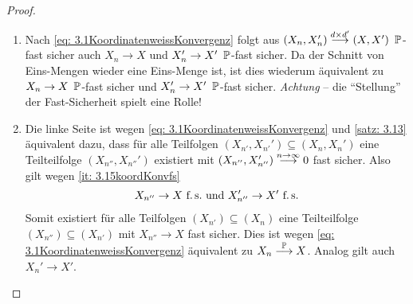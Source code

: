 \begin{proof}
	\begin{enumerate}[label=(zu \arabic*), leftmargin=*]
		\item Nach \cref{eq: 3.1KoordinatenweissKonvergenz} folgt aus $(X_n,X_n') \overset{d \times d'}{\longrightarrow} (X,X') \enskip \P$-fast sicher auch $X_n \to X$ und $X_n' \to X' \enskip \P$-fast sicher. Da der Schnitt von Eins-Mengen wieder eine Eins-Menge ist, ist dies wiederum äquivalent zu $X_n \to X \enskip \P$-fast sicher und $X_n' \to X' \enskip \P$-fast sicher. \textit{Achtung} -- die \enquote{Stellung} der Fast-Sicherheit spielt eine Rolle!
		\item Die linke Seite ist wegen \eqref{eq: 3.1KoordinatenweissKonvergenz} und \cref{satz: 3.13} äquivalent dazu, dass für alle Teilfolgen $(X_{n'},X_{n'}') \subseteq (X_n,X_n')$ eine Teilteilfolge $(X_{n''},X_{n''}')$ existiert mit $(X_{n''},X_{n''}') \ntoinf 0$ fast sicher.
		Also gilt wegen \cref{it: 3.15koordKonvfs}
		\begin{align*}
			X_{n''}\to X\text{ f.\,s.\ und }X_{n''}'\to X'\text{ f.\,s.}
		\end{align*}
		Somit existiert für alle Teilfolgen $(X_{n'}) \subseteq (X_n)$ eine Teilteilfolge $(X_{n''}) \subseteq (X_{n'})$ mit $X_{n''} \to X$ fast sicher. Dies ist wegen \eqref{eq: 3.1KoordinatenweissKonvergenz} äquivalent zu $X_n \probto X$. Analog gilt auch $X_n'\to X'$.
	\end{enumerate}
\end{proof}